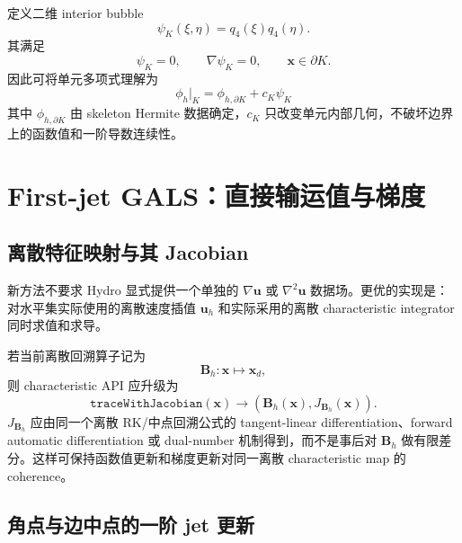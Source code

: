 \documentclass[11pt,a4paper]{ctexart}
\newcommand{\bx}{\bm{x}}
\newcommand{\bu}{\bm{u}}
\newcommand{\bB}{\bm{B}}
\newcommand{\grad}{\nabla}
\begin{document}
定义二维 interior bubble
\begin{equation}
    \psi_K(\xi,\eta)=q_4(\xi)q_4(\eta).
    \label{eq:bubble}
\end{equation}
其满足
\begin{equation}
    \psi_K=0,\qquad \grad\psi_K=0,
    \qquad \bx\in\partial K.
    \label{eq:bubble_boundary}
\end{equation}
因此可将单元多项式理解为
\begin{equation}
    \boxed{
    \phi_h|_K=\phi_{h,\partial K}+c_K\psi_K
    }
    \label{eq:skeleton_bubble}
\end{equation}
其中 $\phi_{h,\partial K}$ 由 skeleton Hermite 数据确定，$c_K$ 只改变单元内部几何，不破坏边界上的函数值和一阶导数连续性。

\section{First-jet GALS：直接输运值与梯度}

\subsection{离散特征映射与其 Jacobian}

新方法不要求 Hydro 显式提供一个单独的 $\nabla\bu$ 或 $\nabla^2\bu$ 数据场。更优的实现是：对水平集实际使用的离散速度插值 $\bu_h$ 和实际采用的离散 characteristic integrator 同时求值和求导。

若当前离散回溯算子记为
\begin{equation}
    \bB_h:\bx\mapsto\bx_d,
\end{equation}
则 characteristic API 应升级为
\begin{equation}
    \boxed{
    \texttt{traceWithJacobian}(\bx)
    \longrightarrow
    (\bB_h(\bx),J_{\bB_h}(\bx)).
    }
\end{equation}
$J_{\bB_h}$ 应由同一个离散 RK/中点回溯公式的 tangent-linear differentiation、forward automatic differentiation 或 dual-number 机制得到，而不是事后对 $\bB_h$ 做有限差分。这样可保持函数值更新和梯度更新对同一离散 characteristic map 的 coherence。

\subsection{角点与边中点的一阶 jet 更新}
\end{document}
